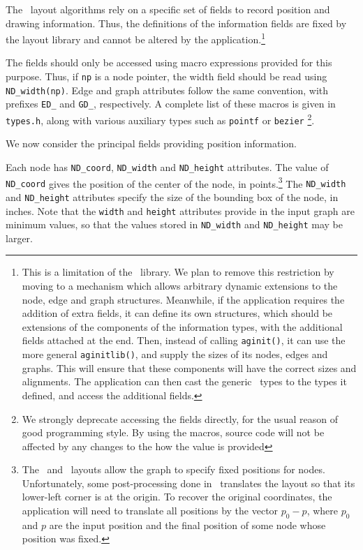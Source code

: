 The \gviz\ layout algorithms rely on a specific set of fields
to record position and drawing information.
Thus, the definitions
of the information fields are fixed by the layout library and
cannot be altered by the application.\footnote{This is a limitation
of the \graph\ library. We plan to remove this restriction by moving to
a mechanism which allows arbitrary dynamic extensions to the
node, edge and graph structures. Meanwhile, if the application requires
the addition of extra fields, it can define its own structures, which
should be extensions of the components of the information types, with
the additional fields attached at the end. Then, instead of calling
{\tt aginit()}, it can use the more general {\tt aginitlib()}, and
supply the sizes of its nodes, edges and graphs. This will ensure
that these components will have the correct sizes and alignments. 
The application can then cast the generic \graph\ types to the
types it defined, and access the additional fields.}

The fields should only be accessed using macro expressions provided for
this purpose.
Thus, if {\tt np} is a node pointer, the width field should
be read using \verb+ND_width(np)+.
Edge and graph attributes follow the same convention, with
prefixes \verb+ED_+ and \verb+GD_+, respectively.
A complete list of these macros is given in {\tt types.h}, 
along with various auxiliary types such as {\tt pointf} or 
{\tt bezier}
\footnote{We strongly deprecate accessing the fields directly, for the usual reason
of good programming style. By using the macros, source code will not be 
affected by any changes to the how the value is provided}.

We now consider the principal fields providing position information.

Each node has {\tt ND\_coord}, {\tt ND\_width} and {\tt ND\_height} 
attributes. The value
of {\tt ND\_coord} gives the position of the center of the node, 
in points.\footnote{
The \neato\ and \fdp\ layouts allow the graph to specify fixed positions
for nodes. Unfortunately, some post-processing done in \gviz\ translates
the layout so that its lower-left corner is at the origin. To recover
the original coordinates, the application will need to translate all positions
by the vector $p_0 - p$, where $p_0$ and $p$ are the input position and
the final position of some node whose position was fixed.
} 
The {\tt ND\_width} and {\tt ND\_height} attributes specify the size of the
bounding box of the node, in inches.
Note that the {\tt width} and {\tt height} attributes provide in the input
graph are minimum values, so that the values stored in {\tt ND\_width} 
and {\tt ND\_height} may be larger.

